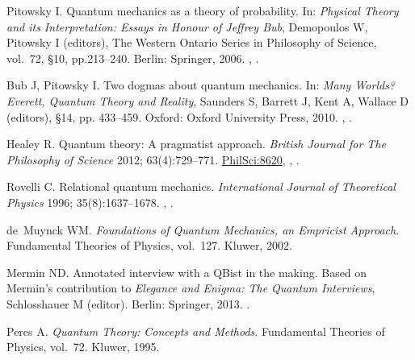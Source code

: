 \documentclass[DIV=calc,fontsize=12pt]{scrartcl} %
\theoremstyle{definition}
\theoremstyle{plain}
\begin{document}
\begin{thebibliography}{10}
Pitowsky I.
\newblock Quantum mechanics as a theory of probability.
\newblock In: \emph{Physical Theory and
its Interpretation: Essays in Honour of Jeffrey Bub}, Demopoulos W, Pitowsky I (editors), The
Western Ontario Series in Philosophy of Science, vol.~72, \S 10, pp.213--240.
Berlin: Springer, 2006.
\newblock \href {http://arxiv.org/abs/quant-ph/0510095}{},
\newblock \href {http://dx.doi.org/10.1007/1-4020-4876-9_10}{}.

Bub J, Pitowsky I.
\newblock Two dogmas about quantum mechanics.
\newblock In: {\em
{Many Worlds? Everett, Quantum Theory and Reality}}, Saunders S, Barrett J, Kent A, Wallace D (editors), \S 14, pp.
433--459. Oxford: Oxford University Press, 2010.
\newblock \href {http://arxiv.org/abs/0712.4258} {},
\href {http://dx.doi.org/10.1093/acprof:oso/9780199560561.003.0016}
{}.

Healey R.
\newblock Quantum theory: A pragmatist approach.
\newblock \emph{British Journal for The Philosophy of Science} 2012; 63(4):729--771.
\newblock \href{http://philsci-archive.pitt.edu/8620/}{PhilSci:8620},
\newblock \href {http://arxiv.org/abs/1008.3896} {},
\href {http://dx.doi.org/10.1093/bjps/axr054}
{}.

Rovelli C.
\newblock Relational quantum mechanics.
\newblock \emph{International Journal of Theoretical Physics} 1996; 35(8):1637--1678.
\newblock \href {http://arxiv.org/abs/quant-ph/9609002}
{}, \href {http://dx.doi.org/10.1007/BF02302261}
{}.

de~Muynck WM.
\newblock \emph{Foundations of Quantum Mechanics, an Empricist Approach}. Fundamental Theories of Physics, vol.~127.
\newblock Kluwer, 2002.

Mermin ND.
\newblock Annotated interview with a QBist in the making.
\newblock Based on Mermin's contribution to
\emph{Elegance and Enigma: The Quantum Interviews}, Schlosshauer M (editor). Berlin: Springer, 2013.
\newblock \href {http://arxiv.org/abs/1301.6551} {}.

Peres A.
\newblock \emph{Quantum Theory: Concepts and Methods}. Fundamental Theories of Physics, vol.~72.
\newblock Kluwer, 1995.


\end{thebibliography}
\end{document}
